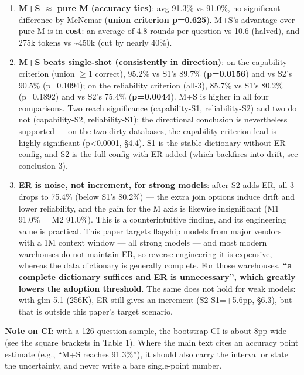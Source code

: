 \documentclass[11pt]{article}
\begin{document}
\begin{enumerate}
\def\labelenumi{\arabic{enumi}.}
\item
  \textbf{M+S $\approx$ pure M (accuracy ties)}: avg 91.3\% vs 91.0\%, no significant difference by McNemar (\textbf{union criterion p=0.625}). M+S's advantage over pure M is in \textbf{cost}: an average of 4.8 rounds per question vs 10.6 (halved), and 275k tokens vs \textasciitilde450k (cut by nearly 40\%).
\item
  \textbf{M+S beats single-shot (consistently in direction)}: on the capability criterion (union $\geq$1 correct), 95.2\% vs S1's 89.7\% (\textbf{p=0.0156}) and vs S2's 90.5\% (p=0.1094); on the reliability criterion (all-3), 85.7\% vs S1's 80.2\% (p=0.1892) and vs S2's 75.4\% (\textbf{p=0.0044}). M+S is higher in all four comparisons. Two reach significance (capability-S1, reliability-S2) and two do not (capability-S2, reliability-S1); the directional conclusion is nevertheless supported --- on the two dirty databases, the capability-criterion lead is highly significant (p\textless0.0001, \S{}4.4). S1 is the stable dictionary-without-ER config, and S2 is the full config with ER added (which backfires into drift, see conclusion 3).
\item
  \textbf{ER is noise, not increment, for strong models}: after S2 adds ER, all-3 drops to 75.4\% (below S1's 80.2\%) --- the extra join options induce drift and lower reliability, and the gain for the M axis is likewise insignificant (M1 91.0\% = M2 91.0\%). This is a counterintuitive finding, and its engineering value is practical. This paper targets flagship models from major vendors with a 1M context window --- all strong models --- and most modern warehouses do not maintain ER, so reverse-engineering it is expensive, whereas the data dictionary is generally complete. For those warehouses, \textbf{``a complete dictionary suffices and ER is unnecessary'', which greatly lowers the adoption threshold}. The same does not hold for weak models: with glm-5.1 (256K), ER still gives an increment (S2-S1=+5.6pp, \S{}6.3), but that is outside this paper's target scenario.
\end{enumerate}

\textbf{Note on CI}: with a 126-question sample, the bootstrap CI is about 8pp wide (see the square brackets in Table 1). Where the main text cites an accuracy point estimate (e.g., ``M+S reaches 91.3\%''), it should also carry the interval or state the uncertainty, and never write a bare single-point number.
\end{document}
